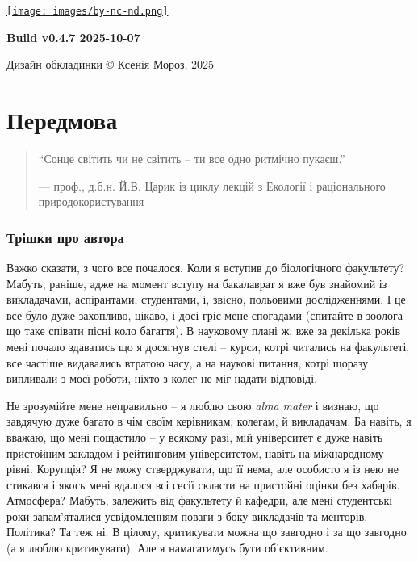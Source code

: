 \documentclass[
  11pt,
]{book}
\begin{document}
\href{https://creativecommons.org/licenses/by-nc-nd/4.0/deed.en}{\texttt{[image: images/by-nc-nd.png]}}

\textbf{Build v0.4.7 2025-10-07}

Дизайн обкладинки © Ксенія Мороз, 2025

\chapter*{Передмова}\label{preface}

\begin{quote}
``Сонце світить чи не світить --
ти все одно ритмічно пукаєш.''

--- проф., д.б.н. Й.В. Царик із циклу лекцій з Екології і раціонального природокористування
\end{quote}

\subsection{Трішки про автора}\label{about-author}

Важко сказати, з чого все почалося. Коли я вступив до біологічного факультету? Мабуть, раніше, адже на момент вступу на бакалаврат я вже був знайомий із викладачами, аспірантами, студентами, і, звісно, польовими дослідженнями. І це все було дуже захопливо, цікаво, і досі гріє мене спогадами (спитайте в зоолога що таке співати пісні коло багаття). В науковому плані ж, вже за декілька років мені почало здаватись що я досягнув стелі -- курси, котрі читались на факультеті, все частіше видавались втратою часу, а на наукові питання, котрі щоразу випливали з моєї роботи, ніхто з колег не міг надати відповіді.

Не зрозумійте мене неправильно -- я люблю свою \emph{alma mater} і визнаю, що завдячую дуже багато в чім своїм керівникам, колегам, й викладачам. Ба навіть, я вважаю, що мені пощастило -- у всякому разі, мій університет є дуже навіть пристойним закладом і рейтинговим університетом, навіть на міжнародному рівні. Корупція? Я не можу стверджувати, що її нема, але особисто я із нею не стикався і якось мені вдалося всі сесії скласти на пристойні оцінки без хабарів. Атмосфера? Мабуть, залежить від факультету й кафедри, але мені студентські роки запам'яталися усвідомленням поваги з боку викладачів та менторів. Політика? Та теж ні. В цілому, критикувати можна що завгодно і за що завгодно (а я люблю критикувати). Але я намагатимусь бути об'єктивним.
\end{document}
